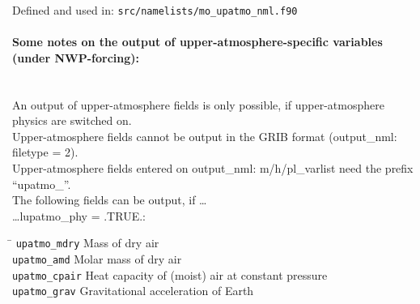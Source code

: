 \begin{longtab}
\end{longtab}

Defined and used in: \verb+src/namelists/mo_upatmo_nml.f90+

\paragraph{Some notes on the output of upper-atmosphere-specific variables (under NWP-forcing):}
\mbox{}\\
An output of upper-atmosphere fields is only possible,
if upper-atmosphere physics are switched on. \\
Upper-atmosphere fields cannot be output in the GRIB format
(output\_nml: filetype = 2). \\
Upper-atmosphere fields entered on output\_nml: m/h/pl\_varlist
need the prefix ``upatmo\_''. \\

The following fields can be output, if \ldots \\

\ldots lupatmo\_phy = .TRUE.:
\begin{tabbing}
\hspace*{0.4\textwidth} \= \kill
\texttt{upatmo\_mdry}      \>  Mass of dry air \\
\texttt{upatmo\_amd}       \>  Molar mass of dry air \\
\texttt{upatmo\_cpair}     \>  Heat capacity of (moist) air at constant pressure \\
\texttt{upatmo\_grav}      \>  Gravitational acceleration of Earth
\end{tabbing}

